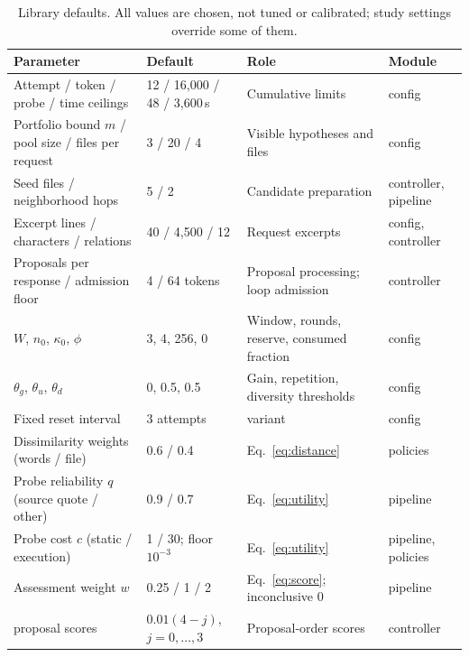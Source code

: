 \documentclass[letterpaper,journal]{IEEEtran}
\newcommand{\code}[1]{\texttt{\detokenize{#1}}}
\begin{document}
\begin{table}[t]
\caption{Library defaults. All values are chosen, not tuned or calibrated; study settings override some of them.}\label{tab:defaults}
\centering\small
\begin{tabular}{@{}p{}p{}p{}p{}@{}}\toprule
Parameter & Default & Role & Module\\\midrule
Attempt / token / probe / time ceilings & 12 / 16,000 / 48 / 3,600\,s & Cumulative limits & config\\
Portfolio bound $m$ / pool size / files per request & 3 / 20 / 4 & Visible hypotheses and files & config\\
Seed files / neighborhood hops & 5 / 2 & Candidate preparation & controller, pipeline\\
Excerpt lines / characters / relations & 40 / 4,500 / 12 & Request excerpts & config, controller\\
Proposals per response / admission floor & 4 / 64 tokens & Proposal processing; loop admission & controller\\
$W$, $n_0$, $\kappa_0$, $\phi$ & 3, 4, 256, 0 & Window, rounds, reserve, consumed fraction & config\\
$\theta_g$, $\theta_u$, $\theta_d$ & 0, 0.5, 0.5 & Gain, repetition, diversity thresholds & config\\
Fixed reset interval & 3 attempts & \code{fixed_reset} variant & config\\
Dissimilarity weights (words / file) & 0.6 / 0.4 & Eq.~\eqref{eq:distance} & policies\\
Probe reliability $q$ (source quote / other) & 0.9 / 0.7 & Eq.~\eqref{eq:utility} & pipeline\\
Probe cost $c$ (static / execution) & 1 / 30; floor $10^{-3}$ & Eq.~\eqref{eq:utility} & pipeline, policies\\
Assessment weight $w$ & 0.25 / 1 / 2 & Eq.~\eqref{eq:score}; inconclusive 0 & pipeline\\
\code{no_probes} proposal scores & $0.01(4-j)$, $j=0,\ldots,3$ & Proposal-order scores & controller\\
\bottomrule\end{tabular}
\end{table}
\end{document}
